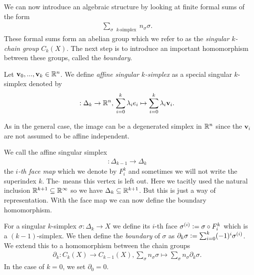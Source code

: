 \documentclass[../master_thesis.tex]{subfiles}
\begin{document}
We can now introduce an algebraic structure by looking at finite formal sums of the form 
\begin{align*}
    \sum_{\text{$\sigma$ $k$-simplex }} n_\sigma \sigma.
\end{align*}
These formal sums form an abelian group which we refer to as the 
\textit{singular $k$-chain group} $C_k(X)$. 
The next step is to introduce an important homomorphism between these groups, called the \textit{boundary}.
\begin{definition}
    Let $\mathbf{v}_0, ... , \mathbf{v}_k \in \mathbb{R}^n$. 
    We define \textit{affine singular $k$-simplex} as a special singular $k$-simplex denoted by
    \begin{align*}
        [\mathbf{v}_0,...,\mathbf{v}_k]: \Delta_k \rightarrow \real^n, \, 
        \sum\limits_{i = 0}^k \lambda_i e_i \mapsto \sum\limits_{i = 0}^k \lambda_i \mathbf{v}_i.
    \end{align*}
\end{definition}
As in the general case, the image can be a degenerated simplex in $\mathbb{R}^n$ since the 
$\mathbf{v}_i$ are not assumed to be affine independent. 

We call the affine singular simplex 
\begin{align}
    [e_0,...,\hat{e}_i,...,e_k]: \Delta_{k-1} \rightarrow \Delta_k \label{eq:face_map}
\end{align}
the \textit{$i$-th face map} which we denote by $F^k_i$ and sometimes we will not write the superindex $k$. 
The $\hat{ }$ means this vertex is left out. Here we tacitly used the 
natural inclusion $\mathbb{R}^{k+1} \subseteq \mathbb{R}^\infty$ so we have 
$\Delta_k \subseteq \mathbb{R}^{k+1}$. But this is just a way of representation.
With the face map we can now define the boundary homomorphism.
\begin{definition}[Boundary]
    For a singular $k$-simplex $\sigma: \Delta_k \rightarrow X$ we define its $i$-th face 
    $\sigma^{(i)} \vcentcolon= \sigma \circ F_i^k$ which is a $(k-1)$-simplex. 
    We then define the \textit{boundary} of $\sigma$ as 
    $\partial_k \sigma \vcentcolon= \sum_{i=0}^k (-1)^i \sigma^{(i)}$. We extend this 
    to a homomorphism between the chain groups
    \begin{align*}
        \partial_k: C_k(X) \rightarrow C_{k-1}(X), 
        \sum_\sigma n_\sigma \sigma \mapsto \sum_\sigma n_\sigma \partial_k \sigma.
    \end{align*}
    In the case of $k=0$, we set $\partial_0 = 0$.
\end{definition}
\end{document}
